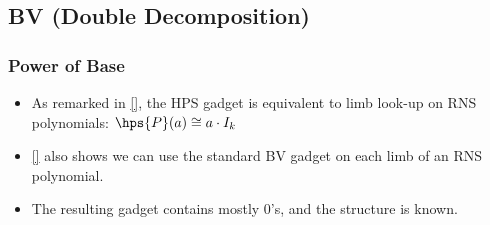 
\subsection{BV (Double Decomposition)}

\subsubsection{Power of Base}
\begin{itemize}
    \item As remarked in \autoref{}, the HPS gadget is equivalent to limb look-up on RNS polynomials: $\hps{P}(a) \cong a\cdot I_k$
    \item \autoref{} also shows we can use the standard BV gadget on each limb of an RNS polynomial.
    \item The resulting gadget contains mostly 0's, and the structure is known.
\end{itemize}


